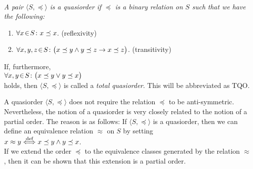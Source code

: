 \begin{Definition}[Quasiorder]  \hspace*{\fill} \\
{\em
  A pair $\langle S, \preceq\rangle$ is a \emph{quasiorder}  if $\preceq$ is a 
  binary relation on $S$ such that we have the following:
  \begin{enumerate}
  \item $\forall x \!\in\! S\colon x \preceq x$. \hspace*{\fill} (reflexivity)
  \item $\forall x, y, z \!\in\! S \colon \bigl(x \preceq y \wedge y \preceq z \rightarrow x \preceq z\bigr)$. 
         \hspace*{\fill} (transitivity)
  \end{enumerate}
  If, furthermore,
  \\[0.2cm]
  \hspace*{1.3cm}
  $\forall x, y \!\in\! S \colon \bigl(x \preceq y \vee y \preceq x\bigr)$
  \\[0.2cm]
  holds, then $\langle S, \preceq \rangle$ is called a \emph{total quasiorder}.  This will be
  abbreviated as \textsc{TQO}.
}
\end{Definition}
A quasiorder $\langle S, \preceq \rangle$ does not require the relation $\preceq$ to be
anti-symmetric.  Nevertheless, the notion of a quasiorder is very closely related to the notion of a
partial order.  The reason is as follows:  If $\langle S, \preceq \rangle$ is a quasiorder, then we
can define an equivalence relation $\approx$ on $S$ by setting
\\[0.2cm]
\hspace*{1.3cm}
$x \approx y \stackrel{\mbox{\scriptsize def}}{\Longleftrightarrow} x \preceq y \wedge y \preceq x$. 
\\[0.2cm]
If we extend the order $\preceq$ to the equivalence classes generated by the relation $\approx$,
then it can be shown that this extension is a partial order.
\vspace*{0.3cm}

